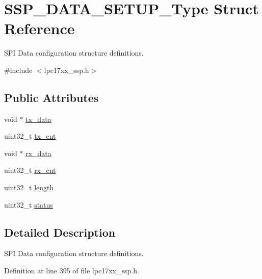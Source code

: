 \hypertarget{struct_s_s_p___d_a_t_a___s_e_t_u_p___type}{\section{\-S\-S\-P\-\_\-\-D\-A\-T\-A\-\_\-\-S\-E\-T\-U\-P\-\_\-\-Type \-Struct \-Reference}
\label{struct_s_s_p___d_a_t_a___s_e_t_u_p___type}
}


\-S\-P\-I \-Data configuration structure definitions.  




{\ttfamily \#include $<$lpc17xx\-\_\-ssp.\-h$>$}

\subsection*{\-Public \-Attributes}
\begin{DoxyCompactItemize}
\item 
void $\ast$ \hyperlink{struct_s_s_p___d_a_t_a___s_e_t_u_p___type_a3ce86564e96199f4bed5d67e13016a74}{tx\-\_\-data}
\item 
uint32\-\_\-t \hyperlink{struct_s_s_p___d_a_t_a___s_e_t_u_p___type_a857e70ea892f6e800fcfc7d971bb1daf}{tx\-\_\-cnt}
\item 
void $\ast$ \hyperlink{struct_s_s_p___d_a_t_a___s_e_t_u_p___type_a8ecbeda1d5013eb75f16e9260e1e99df}{rx\-\_\-data}
\item 
uint32\-\_\-t \hyperlink{struct_s_s_p___d_a_t_a___s_e_t_u_p___type_ad0a0475e1e9ebfd10d6ddacf40a34e20}{rx\-\_\-cnt}
\item 
uint32\-\_\-t \hyperlink{struct_s_s_p___d_a_t_a___s_e_t_u_p___type_a15861aad38292a3b5b5bc2137be7b471}{length}
\item 
uint32\-\_\-t \hyperlink{struct_s_s_p___d_a_t_a___s_e_t_u_p___type_abf9967b343e936a1e2cbdefbe9f53cea}{status}
\end{DoxyCompactItemize}


\subsection{\-Detailed \-Description}
\-S\-P\-I \-Data configuration structure definitions. 

\-Definition at line 395 of file lpc17xx\-\_\-ssp.\-h.



